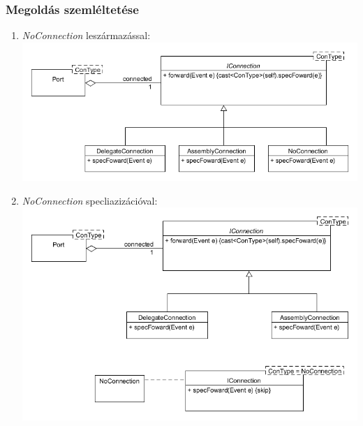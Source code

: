 \documentclass[a4paper,12pt]{report}
\begin{document}
\subsubsection{Megoldás szemléltetése}
\begin{enumerate}
\item \textit{NoConnection} leszármazással: \\
\includegraphics[scale=0.6]{extended_connection.png}
\item \textit{NoConnection} specliazizációval: \\
\includegraphics[scale=0.6]{extended_connection_spec.png}
\end{enumerate}
\end{document}
